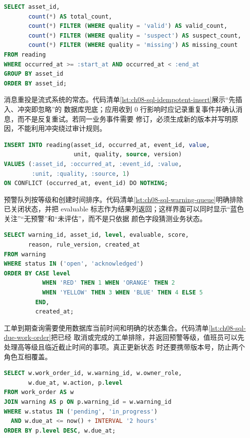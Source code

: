 \begin{lstlisting}[label={lst:ch08-sql-quality-count},language=SQL,caption={质量码分布统计查询}]
SELECT asset_id,
       count(*) AS total_count,
       count(*) FILTER (WHERE quality = 'valid') AS valid_count,
       count(*) FILTER (WHERE quality = 'suspect') AS suspect_count,
       count(*) FILTER (WHERE quality = 'missing') AS missing_count
FROM reading
WHERE occurred_at >= :start_at AND occurred_at < :end_at
GROUP BY asset_id
ORDER BY asset_id;
\end{lstlisting}

消息重投是流式系统的常态。代码清单\ref{lst:ch08-sql-idempotent-insert}展示“先插入、冲突即忽略”的
数据库兜底；应用收到 0 行影响时应记录重复事件并确认消息，而不是反复重试。若同一业务事件需要
修订，必须生成新的版本并写明原因，不能利用冲突绕过审计规则。

\begin{lstlisting}[label={lst:ch08-sql-idempotent-insert},language=SQL,caption={基于事件 ID 的幂等写入}]
INSERT INTO reading(asset_id, occurred_at, event_id, value,
                    unit, quality, source, version)
VALUES (:asset_id, :occurred_at, :event_id, :value,
        :unit, :quality, :source, 1)
ON CONFLICT (occurred_at, event_id) DO NOTHING;
\end{lstlisting}

预警队列按等级和创建时间排序。代码清单\ref{lst:ch08-sql-warning-queue}明确排除已关闭状态，并把
evaluable 标志作为结果列返回；这样界面可以同时显示“蓝色关注”“无预警”和“未评估”，而不是只依据
颜色字段猜测业务状态。

\begin{lstlisting}[label={lst:ch08-sql-warning-queue},language=SQL,caption={待处理预警队列查询}]
SELECT warning_id, asset_id, level, evaluable, score,
       reason, rule_version, created_at
FROM warning
WHERE status IN ('open', 'acknowledged')
ORDER BY CASE level
           WHEN 'RED' THEN 1 WHEN 'ORANGE' THEN 2
           WHEN 'YELLOW' THEN 3 WHEN 'BLUE' THEN 4 ELSE 5
         END,
         created_at;
\end{lstlisting}

工单到期查询需要使用数据库当前时间和明确的状态集合。代码清单\ref{lst:ch08-sql-due-work-order}把已经
取消或完成的工单排除，并返回预警等级，值班员可以先处理高等级且临近截止时间的事项。真正更新状态
时还要携带版本号，防止两个角色互相覆盖。

\begin{lstlisting}[label={lst:ch08-sql-due-work-order},language=SQL,caption={即将到期工单查询}]
SELECT w.work_order_id, w.warning_id, w.owner_role,
       w.due_at, w.action, p.level
FROM work_order AS w
JOIN warning AS p ON p.warning_id = w.warning_id
WHERE w.status IN ('pending', 'in_progress')
  AND w.due_at <= now() + INTERVAL '2 hours'
ORDER BY p.level DESC, w.due_at;
\end{lstlisting}

